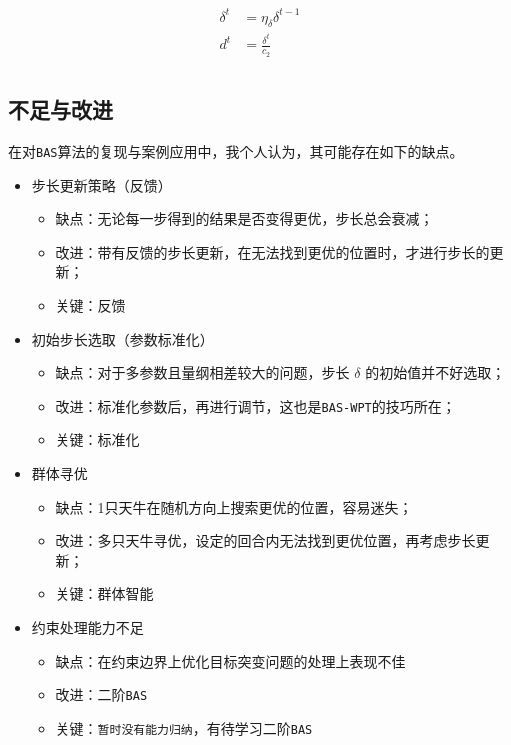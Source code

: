\documentclass[]{ctexbook}
\providecommand{\tightlist}{%
  \setlength{\itemsep}{0pt}\setlength{\parskip}{0pt}}
\begin{document}
\begin{equation}
\begin{split}
\delta^t&=\eta_{\delta} \delta^{t-1}\\
d^t &= \frac{\delta^t}{c_2}\\
\end{split}
\label{eq:WPTupdate} 
\end{equation}

\subsection{不足与改进}\label{BASimprove}

在对\texttt{BAS}算法的复现与案例应用中，我个人认为，其可能存在如下的缺点。

\begin{itemize}
\tightlist
\item
  步长更新策略（反馈）

  \begin{itemize}
  \tightlist
  \item
    缺点：无论每一步得到的结果是否变得更优，步长总会衰减；
  \item
    改进：带有反馈的步长更新，在无法找到更优的位置时，才进行步长的更新；
  \item
    关键：反馈
  \end{itemize}
\item
  初始步长选取（参数标准化）

  \begin{itemize}
  \tightlist
  \item
    缺点：对于多参数且量纲相差较大的问题，步长 \(\delta\)
    的初始值并不好选取；
  \item
    改进：标准化参数后，再进行调节，这也是\texttt{BAS-WPT}的技巧所在；
  \item
    关键：标准化
  \end{itemize}
\item
  群体寻优

  \begin{itemize}
  \tightlist
  \item
    缺点：1只天牛在随机方向上搜索更优的位置，容易迷失；
  \item
    改进：多只天牛寻优，设定的回合内无法找到更优位置，再考虑步长更新；
  \item
    关键：群体智能
  \end{itemize}
\item
  约束处理能力不足

  \begin{itemize}
  \tightlist
  \item
    缺点：在约束边界上优化目标突变问题的处理上表现不佳
  \item
    改进：二阶\texttt{BAS}
  \item
    关键：\texttt{暂时没有能力归纳}，有待学习二阶\texttt{BAS}
  \end{itemize}
\end{itemize}
\end{document}
